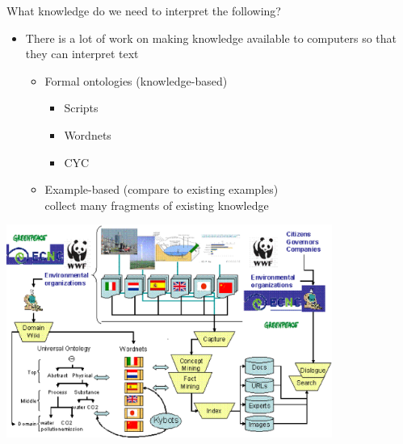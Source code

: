 \documentclass[headrule,footrule]{foils}
\begin{document}
What knowledge do we need to interpret the following?

\begin{exe}
  \ex 
  \begin{xlist}
    \ex {}
    \ex {}
  \end{xlist}
  \ex 
  \begin{xlist}
    \ex {}
    \ex {}
  \end{xlist}
  \ex 
  \begin{xlist}
    \ex {}
    \ex {}
  \end{xlist}
 \ex 
  \begin{xlist}
    \ex {}
    \ex {}
    \ex {}
    \ex {}
    \ex {}

  \end{xlist}

\end{exe}



\begin{itemize}
\item There is a lot of work on making knowledge available to
  computers so that they can interpret text
  \begin{itemize}
  \item Formal ontologies (knowledge-based)
    \begin{itemize}
    \item Scripts
    \item Wordnets
    \item CYC
    \end{itemize}
  \item Example-based (compare to existing examples)
    \\ collect many fragments of existing knowledge
  \end{itemize}
\end{itemize}


\begin{center}
  \includegraphics[width=0.8\textwidth]{pics/kyoto-project.eps}
\end{center}
\end{document}
